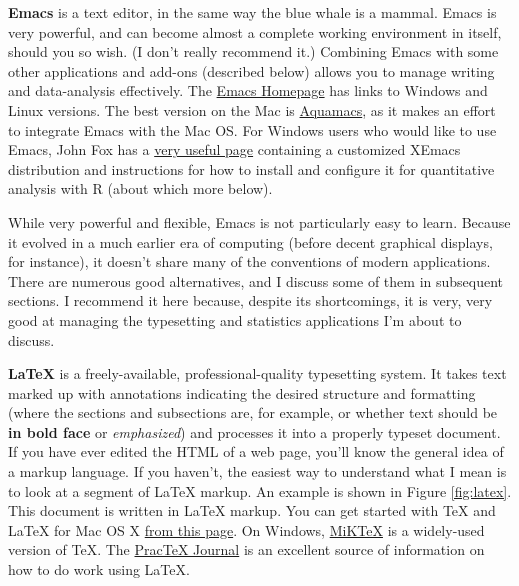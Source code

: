 \documentclass[11pt,article,oneside]{memoir}
\begin{document}
\smallskip

\textbf{Emacs} is a text editor, in the same way the blue whale is a mammal. Emacs is very powerful, and can become almost a complete working environment in itself, should you so wish. (I don't really recommend it.) Combining Emacs with some other applications and add-ons (described below) allows you to manage writing and data-analysis effectively. The \href{http://www.gnu.org/software/emacs/}{Emacs Homepage} has links to Windows and Linux versions. The best version on the Mac is \href{http://aquamacs.org/}{Aquamacs}, as it makes an effort to integrate Emacs with the Mac OS. For Windows users who would like to use Emacs, John Fox has a
\href{http://socserv.mcmaster.ca/jfox/Books/Companion/ESS/}{very useful page}
containing a customized XEmacs distribution and instructions for how to install and
configure it for quantitative analysis with R (about which more below).

While very powerful and flexible, Emacs is not particularly easy to learn. Because it evolved in a much  earlier era of computing (before decent graphical displays, for instance), it doesn't share many of the conventions of modern applications. There are numerous good alternatives, and I discuss some of them in subsequent sections. I recommend it here because, despite its shortcomings, it is very, very good at managing the typesetting and statistics applications I'm about to discuss.

\smallskip

\textbf{LaTeX} is a freely-available, professional-quality typesetting system. It takes text marked up with annotations indicating the desired structure and formatting (where the sections and subsections are, for example, or whether text should be \textbf{in bold face} or \emph{emphasized}) and processes it into a properly typeset document. If you have ever edited the HTML of a web page, you'll know the general idea of a markup language. If you haven't, the easiest way to understand what I mean is to look at a segment of LaTeX markup. An example is shown in Figure \ref{fig:latex}. This document is written in LaTeX markup. You can get started with TeX and LaTeX for Mac OS X \href{http://tug.org/mactex/}{from this page}. On Windows, \href{http://www.miktex.org/}{MiKTeX} is a widely-used version of TeX. The \href{http://www.tug.org/pracjourn/}{PracTeX Journal} is an excellent source of information on how to do work using LaTeX. 
\end{document}
